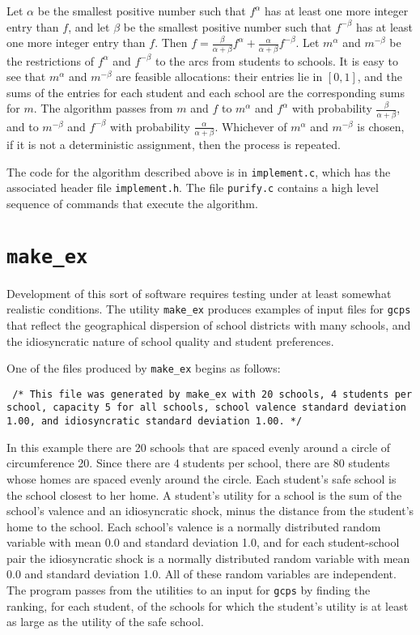 \documentclass[12pt]{article}
\theoremstyle{definition}
\begin{document}
Let $\alpha$ be the smallest positive number such that $f^\alpha$ has
at least one more integer entry than $f$, and let $\beta$ be the
smallest positive number such that $f^{-\beta}$ has at least one more
integer entry than $f$.  Then $f = \tfrac{\beta}{\alpha +
  \beta}f^\alpha + \tfrac{\alpha}{\alpha + \beta}f^{-\beta}$.  Let
$m^\alpha$ and $m^{-\beta}$ be the restrictions of $f^\alpha$ and
$f^{-\beta}$ to the arcs from students to schools.  It is easy to see
that $m^\alpha$ and $m^{-\beta}$ are feasible allocations: their
entries lie in $[0,1]$, and the sums of the entries for each student
and each school are the corresponding sums for $m$.  The algorithm
passes from $m$ and $f$ to $m^\alpha$ and $f^{\alpha}$ with
probability $\tfrac{\beta}{\alpha + \beta}$, and to $m^{-\beta}$ and
$f^{-\beta}$ with probability $\tfrac{\alpha}{\alpha + \beta}$.
Whichever of $m^\alpha$ and $m^{-\beta}$ is chosen, if it is not a
deterministic assignment, then the process is repeated.

The code for the algorithm described above is in \texttt{implement.c},
which has the associated header file \texttt{implement.h}.  The file
\texttt{purify.c} contains a high level sequence of commands that
execute the algorithm.

\section{\texttt{make\_ex}}

Development of this sort of software requires testing under at least
somewhat realistic conditions.  The utility \texttt{make\_ex} produces
examples of input files for \texttt{gcps} that reflect the
geographical dispersion of school districts with many schools, and the
idiosyncratic nature of school quality and student preferences.

One of the files produced by \texttt{make\_ex} begins as follows:
\begin{obeylines}\texttt{
    /* This file was generated by make\_ex with 20 schools,
    4 students per school, capacity 5 for all schools,
    school valence standard deviation 1.00,
    and idiosyncratic standard deviation 1.00. */
}
\end{obeylines} \noindent
In this example there are 20 schools that are spaced evenly around a
circle of circumference 20.  Since there are 4 students per school,
there are 80 students whose homes are spaced evenly around the circle.
Each student's safe school is the school closest to her home.  A
student's utility for a school is the sum of the school's valence and
an idiosyncratic shock, minus the distance from the student's home to
the school.  Each school's valence is a normally distributed random
variable with mean 0.0 and standard deviation 1.0, and for each
student-school pair the idiosyncratic shock is a normally distributed
random variable with mean 0.0 and standard deviation 1.0.  All of
these random variables are independent.  The program passes from the
utilities to an input for \texttt{gcps} by finding the ranking, for
each student, of the schools for which the student's utility is at
least as large as the utility of the safe school.
\end{document}

